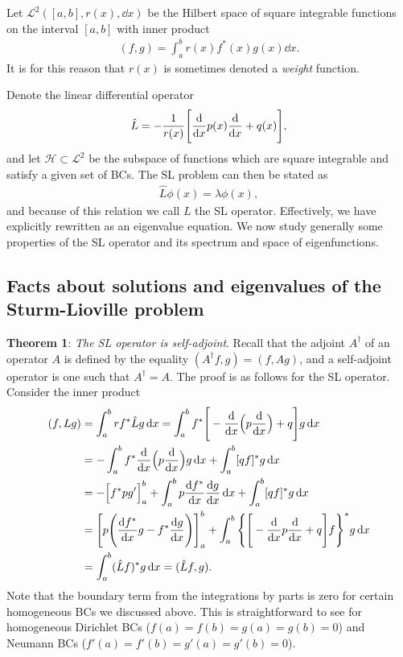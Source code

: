 Let $\mathcal{L}^2([a,b],r(x),\dd{x})$ be the Hilbert space of square integrable functions on the interval $[a,b]$ with inner product
\begin{eqnarray}
    (f,g) = \int_{a}^{b} r(x) f^{*}(x) g(x) \dd{x}
.\end{eqnarray}
It is for this reason that $r(x)$ is sometimes denoted a \textit{weight} function.

Denote the linear differential operator
\begin{eqnarray}
    \label{eq:SL-lin-op}
    \hat{L} = -\frac{1}{r(x)} \Bigg[ \dv{x} p(x) \dv{x} + q(x) \Bigg]
,\end{eqnarray}
and let $\mathcal{H} \subset \mathcal{L}^2$ be the subspace of functions which are square integrable and satisfy a given set of BCs.
The SL problem can then be stated as 
\begin{eqnarray}
    \hat{L} \phi(x) = \lambda \phi(x)
,\end{eqnarray}
and because of this relation we call $L$ the SL operator.
Effectively, we have explicitly rewritten  as an eigenvalue equation.
We now study generally some properties of the SL operator and its spectrum and space of eigenfunctions.

\subsection{Facts about solutions and eigenvalues of the Sturm-Lioville problem}
\textbf{Theorem 1}: \textit{The SL operator is self-adjoint}. Recall that the adjoint $A^{\dagger}$ of an operator $A$ is defined by the equality $(A^{\dagger}f, g) = (f,Ag)$, and a self-adjoint operator is one such that $A^{\dagger} = A$.
The proof is as follows for the SL operator.
Consider the inner product
\begin{align}
    (f,Lg) &= \int_{a}^{b} r f^{*} \hat{L} g \dd{x} = \int_{a}^{b} f^{*} \Bigg[ - \dv{x} \Big( p \dv{x} \Big) + q \Bigg] g \dd{x} \nonumber \\
    &= -\int_{a}^{b} f^{*} \dv{x} \Big( p \dv{x} \Big) g \dd{x} + \int_{a}^{b} [ q f ]^{*} g \dd{x} \nonumber \\
    &= -\Big[ f^{*} p g' \Big]_{a}^{b} + \int_{a}^{b} p \dv{f^{*}}{x} \dv{g}{x} \dd{x} + \int_{a}^{b} [ q f ]^{*} g \dd{x} \nonumber \\
    &= \Bigg[ p \Bigg( \dv{f^{*}}{x} g - f^{*} \dv{g}{x} \Bigg) \Bigg]_{a}^{b} + \int_{a}^{b} \Bigg\{ \Bigg[ -\dv{x} p \dv{x} + q \Bigg] f \Bigg\}^{*} g \dd{x} \nonumber \\
    &= \int_{a}^{b} ( \hat{L} f )^{*} g \dd{x} = ( \hat{L} f,g )
.\end{align}
Note that the boundary term from the integrations by parts is zero for certain homogeneous BCs we discussed above.
This is straightforward to see for homogeneous Dirichlet BCs ($f(a) = f(b) = g(a) = g(b) = 0$) and Neumann BCs ($f'(a) = f'(b) = g'(a) = g'(b) = 0$).

